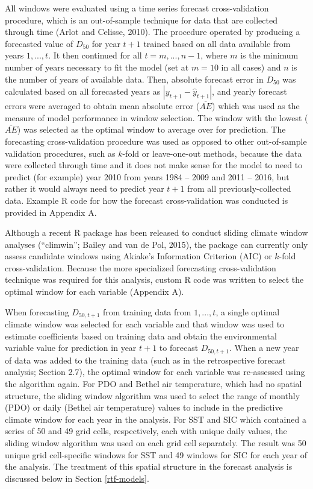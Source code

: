 \documentclass[12pt,]{book}
\theoremstyle{definition}
\theoremstyle{definition}
\theoremstyle{definition}
\theoremstyle{remark}
\begin{document}
All windows were evaluated using a time series forecast cross-validation
procedure, which is an out-of-sample technique for data that are
collected through time (Arlot and Celisse, 2010). The procedure operated
by producing a forecasted value of \(D_{50}\) for year \(t+1\) trained
based on all data available from years \(1,..., t\). It then continued
for all \(t = m, ..., n-1\), where \(m\) is the minimum number of years
necessary to fit the model (set at \(m = 10\) in all cases) and \(n\) is
the number of years of available data. Then, absolute forecast error in
\(D_{50}\) was calculated based on all forecasted years as
\(|y_{t+1} - \hat{y}_{t+1}|\), and yearly forecast errors were averaged
to obtain mean absolute error (\(\overline{AE}\)) which was used as the
measure of model performance in window selection. The window with the
lowest (\(\overline{AE}\)) was selected as the optimal window to average
over for prediction. The forecasting cross-validation procedure was used
as opposed to other out-of-sample validation procedures, such as
\(k\)-fold or leave-one-out methods, because the data were collected
through time and it does not make sense for the model to need to predict
(for example) year 2010 from years 1984 -- 2009 and 2011 -- 2016, but
rather it would always need to predict year \(t+1\) from all
previously-collected data. Example R code for how the forecast
cross-validation was conducted is provided in Appendix A.

Although a recent R package has been released to conduct sliding climate
window analyses (``climwin''; Bailey and van de Pol, 2015), the package
can currently only assess candidate windows using Akiake's Information
Criterion (AIC) or \(k\)-fold cross-validation. Because the more
specialized forecasting cross-validation technique was required for this
analysis, custom R code was written to select the optimal window for
each variable (Appendix A).

When forecasting \(D_{50,t+1}\) from training data from \(1,..., t\), a
single optimal climate window was selected for each variable and that
window was used to estimate coefficients based on training data and
obtain the environmental variable value for prediction in year \(t+1\)
to forecast \(D_{50,t+1}\). When a new year of data was added to the
training data (such as in the retrospective forecast analysis; Section
2.7), the optimal window for each variable was re-assessed using the
algorithm again. For PDO and Bethel air temperature, which had no
spatial structure, the sliding window algorithm was used to select the
range of monthly (PDO) or daily (Bethel air temperature) values to
include in the predictive climate window for each year in the analysis.
For SST and SIC which contained a series of 50 and 49 grid cells,
respectively, each with unique daily values, the sliding window
algorithm was used on each grid cell separately. The result was 50
unique grid cell-specific windows for SST and 49 windows for SIC for
each year of the analysis. The treatment of this spatial structure in
the forecast analysis is discussed below in Section \ref{rtf-models}.
\end{document}
